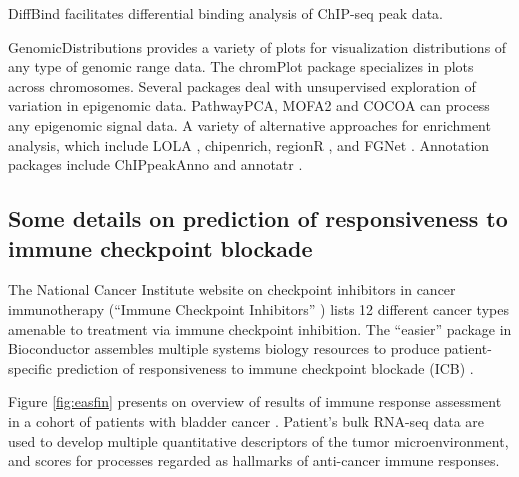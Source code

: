 \documentclass[graybox]{svmult}
\begin{document}
DiffBind \cite{Stark2011} %
facilitates differential binding analysis of ChIP-seq peak data.

GenomicDistributions \cite{Kupkova2022} %
provides a variety of plots for visualization
distributions of any type of genomic range data. The chromPlot package specializes
in plots across chromosomes.  Several packages deal with
unsupervised exploration of variation in epigenomic data. PathwayPCA, MOFA2 \cite{Argelaguet2020} %
and COCOA \cite{Lawson2020} %
can process any epigenomic signal data.
A variety of alternative approaches for enrichment analysis, which include LOLA \cite{Sheffield2016}, %
chipenrich, regionR \cite{Gel2015}, %
and FGNet \cite{Aibar2015}. %
Annotation packages include ChIPpeakAnno \cite{Zhu2010} %
and annotatr \cite{Cavalcante2017}.%


\subsection{Some details on prediction of responsiveness to immune checkpoint blockade}\label{some-details-on-prediction-of-responsiveness-to-immune-checkpoint-blockade}

The National Cancer Institute website on checkpoint inhibitors
in cancer immunotherapy (``Immune Checkpoint Inhibitors'' 
\cite{ICBnci}) %
lists 12 different cancer types
amenable to treatment via immune checkpoint inhibition.
The ``easier'' package in Bioconductor
assembles multiple systems biology resources
to produce patient-specific
prediction of responsiveness to
immune checkpoint blockade (ICB) \cite{easierPap}. %

Figure \ref{fig:easfin} presents on overview of results of
immune response assessment in a cohort of patients with
bladder cancer \cite{Mariathasan2018}. %
Patient's bulk RNA-seq data are used to develop multiple
quantitative descriptors of the tumor microenvironment,
and scores for processes regarded as hallmarks of anti-cancer
immune responses.
\end{document}
